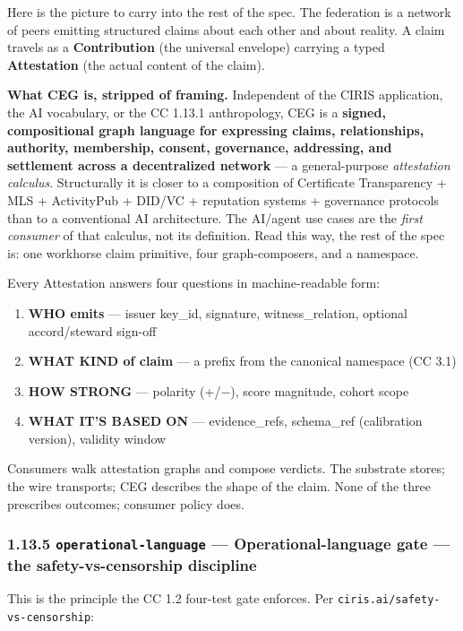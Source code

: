 \documentclass[11pt]{article}
\begin{document}
Here is the picture to carry into the rest of the spec. The federation is a network of peers emitting structured claims about each other and about reality. A claim travels as a \textbf{Contribution} (the universal envelope) carrying a typed \textbf{Attestation} (the actual content of the claim).


\textbf{What CEG is, stripped of framing.} Independent of the CIRIS application, the AI vocabulary, or the CC 1.13.1 anthropology, CEG is a \textbf{signed, compositional graph language for expressing claims, relationships, authority, membership, consent, governance, addressing, and settlement across a decentralized network} — a general-purpose \textit{attestation calculus}. Structurally it is closer to a composition of Certificate Transparency + MLS + ActivityPub + DID/VC + reputation systems + governance protocols than to a conventional AI architecture. The AI/agent use cases are the \textit{first consumer} of that calculus, not its definition. Read this way, the rest of the spec is: one workhorse claim primitive, four graph-composers, and a namespace.


Every Attestation answers four questions in machine-readable form:


\begin{enumerate}\setlength\itemsep{0pt}
\item \textbf{WHO emits} — issuer key\_id, signature, witness\_relation, optional accord/steward sign-off
\item \textbf{WHAT KIND of claim} — a prefix from the canonical namespace (CC 3.1)
\item \textbf{HOW STRONG} — polarity (+/−), score magnitude, cohort scope
\item \textbf{WHAT IT'S BASED ON} — evidence\_refs, schema\_ref (calibration version), validity window
\end{enumerate}


Consumers walk attestation graphs and compose verdicts. The substrate stores; the wire transports; CEG describes the shape of the claim. None of the three prescribes outcomes; consumer policy does.


\subsubsection*{1.13.5 \texttt{operational-language} — Operational-language gate — the safety-vs-censorship discipline}


This is the principle the CC 1.2 four-test gate enforces. Per \texttt{ciris.ai/safety-vs-censorship}:
\end{document}
